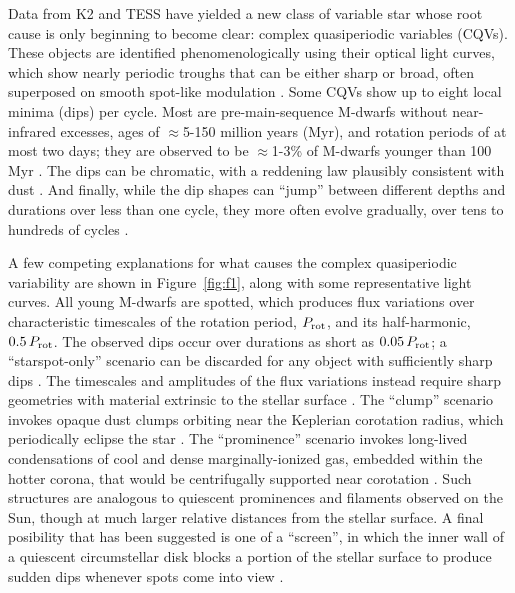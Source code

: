 \documentclass[11pt,twocolumn,tighten]{aastex63}
\begin{document}
Data from K2 and TESS have yielded a new class of variable star whose
root cause is only beginning to become clear: complex quasiperiodic
variables (CQVs).  These objects are identified phenomenologically
using their optical light curves, which show nearly periodic troughs
that can be either sharp or broad, often superposed on smooth
spot-like modulation
\citep{2017AJ....153..152S,2018AJ....155...63S,2019ApJ...876..127Z}.
Some CQVs show up to eight local minima (dips) per cycle.  Most 
are pre-main-sequence M-dwarfs without near-infrared excesses, 
ages of $\approx$5-150 million years (Myr), and rotation periods of at
most two days; they are observed to be $\approx$1-3\% of M-dwarfs
younger than 100 Myr \citep{2016AJ....152..114R,2022AJ....163..144G}.
The dips can be chromatic, with a reddening law plausibly consistent
with dust
\citep{2020AJ....160...86B,2022AJ....163..144G,2023MNRAS.518.2921K}.
And finally, while the dip shapes can ``jump'' between different
depths and durations over less than one cycle, they more often evolve
gradually, over tens to hundreds of cycles
\citep[e.g.][]{2017AJ....153..152S,2022ApJ...925...75P,2023ApJ...945..114P}.

A few competing explanations for what causes the complex quasiperiodic
variability are shown in Figure~\ref{fig:f1}, along with some
representative light curves.  All young M-dwarfs are spotted, which
produces flux variations over characteristic timescales of the
rotation period, $P_{\rm rot}$, and its half-harmonic, $0.5\,P_{\rm
rot}$.  The observed dips occur over durations as short as
$0.05\,P_{\rm rot}$; a ``starspot-only'' scenario can be discarded for
any object with sufficiently sharp dips
\citep{2017AJ....153..152S,2021MNRAS.500.1366K}.   The timescales and
amplitudes of the flux variations instead require sharp geometries
with material extrinsic to the stellar surface
\citep[e.g.][]{2017AJ....153..152S,2022AJ....163..144G}.  The
``clump'' scenario invokes opaque dust clumps orbiting near the Keplerian
corotation radius, which periodically eclipse the star
\citep{2017AJ....153..152S,2023MNRAS.518.4734S}.  The
``prominence'' scenario invokes long-lived condensations of cool and dense
marginally-ionized gas, embedded within the
hotter corona, that would be centrifugally supported near corotation
\citep{1989MNRAS.238..657C,2019MNRAS.482.2853J,2022MNRAS.514.5465W}.
Such structures are analogous to quiescent prominences and filaments
observed on the Sun, though at much larger relative distances from the
stellar surface.
A final posibility that has been suggested is one of a ``screen'', in
which the inner wall of a quiescent circumstellar disk blocks a
portion of the stellar surface to produce sudden dips whenever spots
come into view \citep{2019ApJ...876..127Z}.  
\end{document}
